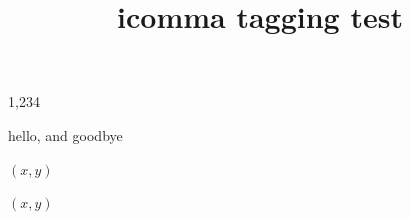 \documentclass{article}
\title{icomma tagging test}
\begin{document}
1,234

hello, and goodbye

$(x,y)$

$(x, y)$
\end{document}
